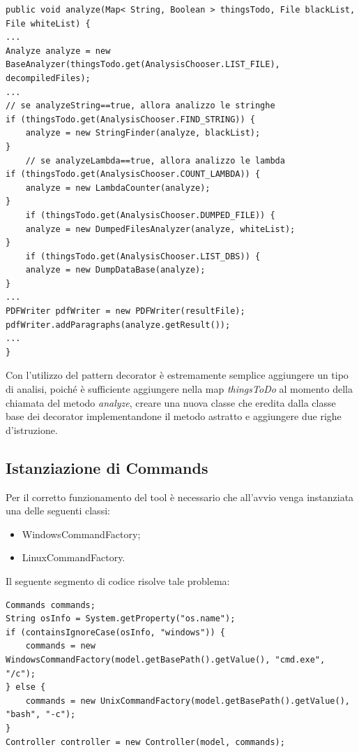 \begin{lstlisting}[caption={Decorator},label={lst:analyze}]
public void analyze(Map< String, Boolean > thingsTodo, File blackList, File whiteList) {
...
Analyze analyze = new BaseAnalyzer(thingsTodo.get(AnalysisChooser.LIST_FILE), decompiledFiles);
...
// se analyzeString==true, allora analizzo le stringhe
if (thingsTodo.get(AnalysisChooser.FIND_STRING)) {
    analyze = new StringFinder(analyze, blackList);
}
    // se analyzeLambda==true, allora analizzo le lambda
if (thingsTodo.get(AnalysisChooser.COUNT_LAMBDA)) {
    analyze = new LambdaCounter(analyze);
}
    if (thingsTodo.get(AnalysisChooser.DUMPED_FILE)) {
    analyze = new DumpedFilesAnalyzer(analyze, whiteList);
}
    if (thingsTodo.get(AnalysisChooser.LIST_DBS)) {
    analyze = new DumpDataBase(analyze);
}
...
PDFWriter pdfWriter = new PDFWriter(resultFile);
pdfWriter.addParagraphs(analyze.getResult());
...
}
\end{lstlisting}

Con l'utilizzo del pattern decorator \`{e} estremamente semplice aggiungere un tipo di analisi, poiché è sufficiente aggiungere nella map \textit{thingsToDo} al momento della chiamata del metodo \textit{analyze}, creare una nuova classe che eredita dalla classe base dei decorator implementandone il metodo astratto e aggiungere due righe d'istruzione.

\subsection{Istanziazione di Commands}\label{subsec:istanziazione-di-commands}
Per il corretto funzionamento del tool è necessario che all'avvio venga instanziata una delle seguenti classi:
\begin{itemize}
    \item WindowsCommandFactory;
    \item LinuxCommandFactory.
\end{itemize}
Il seguente segmento di codice risolve tale problema:

\begin{lstlisting}[caption={Creazione dell'istanza di Commands in base al S.O.},label={lst:commands}]
Commands commands;
String osInfo = System.getProperty("os.name");
if (containsIgnoreCase(osInfo, "windows")) {
    commands = new WindowsCommandFactory(model.getBasePath().getValue(), "cmd.exe", "/c");
} else {
    commands = new UnixCommandFactory(model.getBasePath().getValue(), "bash", "-c");
}
Controller controller = new Controller(model, commands);
\end{lstlisting}